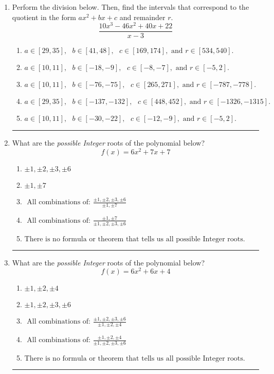 \documentclass[14pt]{extbook}
\newcommand{\litem}[1]{\item#1\hspace*{-1cm}\rule{\textwidth}{0.4pt}}
\begin{document}
\begin{enumerate}
{\begin{enumerate}[label=\Alph*.]
\end{enumerate} }
\litem{
Perform the division below. Then, find the intervals that correspond to the quotient in the form $ax^2+bx+c$ and remainder $r$.\[ \frac{10x^{3} -46 x^{2} +40 x + 22}{x -3} \]\begin{enumerate}[label=\Alph*.]
\item \( a \in [29, 35], \text{   } b \in [41, 48], \text{   } c \in [169, 174], \text{   and   } r \in [534, 540]. \)
\item \( a \in [10, 11], \text{   } b \in [-18, -9], \text{   } c \in [-8, -7], \text{   and   } r \in [-5, 2]. \)
\item \( a \in [10, 11], \text{   } b \in [-76, -75], \text{   } c \in [265, 271], \text{   and   } r \in [-787, -778]. \)
\item \( a \in [29, 35], \text{   } b \in [-137, -132], \text{   } c \in [448, 452], \text{   and   } r \in [-1326, -1315]. \)
\item \( a \in [10, 11], \text{   } b \in [-30, -22], \text{   } c \in [-12, -9], \text{   and   } r \in [-5, 2]. \)

\end{enumerate} }
\litem{
What are the \textit{possible Integer} roots of the polynomial below?\[ f(x) = 6x^{2} +7 x + 7 \]\begin{enumerate}[label=\Alph*.]
\item \( \pm 1,\pm 2,\pm 3,\pm 6 \)
\item \( \pm 1,\pm 7 \)
\item \( \text{ All combinations of: }\frac{\pm 1,\pm 2,\pm 3,\pm 6}{\pm 1,\pm 7} \)
\item \( \text{ All combinations of: }\frac{\pm 1,\pm 7}{\pm 1,\pm 2,\pm 3,\pm 6} \)
\item \( \text{There is no formula or theorem that tells us all possible Integer roots.} \)

\end{enumerate} }
\litem{
What are the \textit{possible Integer} roots of the polynomial below?\[ f(x) = 6x^{2} +6 x + 4 \]\begin{enumerate}[label=\Alph*.]
\item \( \pm 1,\pm 2,\pm 4 \)
\item \( \pm 1,\pm 2,\pm 3,\pm 6 \)
\item \( \text{ All combinations of: }\frac{\pm 1,\pm 2,\pm 3,\pm 6}{\pm 1,\pm 2,\pm 4} \)
\item \( \text{ All combinations of: }\frac{\pm 1,\pm 2,\pm 4}{\pm 1,\pm 2,\pm 3,\pm 6} \)
\item \( \text{There is no formula or theorem that tells us all possible Integer roots.} \)

\end{enumerate} }
\end{enumerate}
\end{document}
